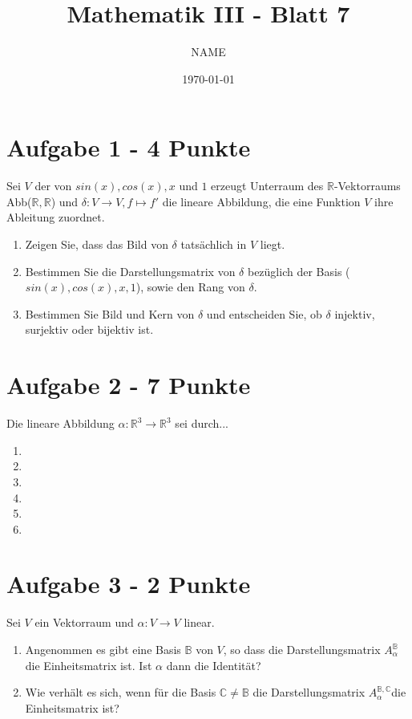\documentclass[a4paper]{article}
\author{NAME}
\title{\vspace{-2cm}Mathematik III - Blatt 7}
\date{\today{}}
\begin{document}
        
\maketitle

\section*{Aufgabe 1 - 4 Punkte}
Sei $V$ der von $sin(x),cos(x),x$ und $1$ erzeugt Unterraum des $\mathbb{R}$-Vektorraums Abb($\mathbb{R},\mathbb{R}$) und $\delta: V \rightarrow V, f \mapsto f'$ die lineare Abbildung, die eine Funktion $V$ ihre Ableitung zuordnet.

   \begin{enumerate}[label=(\alph*)]
\item Zeigen Sie, dass das Bild von $\delta$ tatsächlich in $V$ liegt.
    \item Bestimmen Sie die Darstellungsmatrix von $\delta$ bezüglich der Basis ($sin(x),cos(x),x,1$), sowie den Rang von $\delta$.
    \item Bestimmen Sie Bild und Kern von $\delta$ und entscheiden Sie, ob $\delta$ injektiv, surjektiv oder bijektiv ist.
 \end{enumerate}
 

\section*{Aufgabe 2 - 7 Punkte}
Die lineare Abbildung $\alpha: \mathbb{R}^3 \rightarrow \mathbb{R}^3$ sei durch...

  \begin{enumerate}[label=(\alph*)]
\item
    \item 
    \item
\item
    \item 
    \item
 \end{enumerate}


\section*{Aufgabe 3 - 2 Punkte}
Sei $V$ ein Vektorraum und $\alpha: V \rightarrow V$ linear.
  \begin{enumerate}[label=(\alph*)]
\item Angenommen es gibt eine Basis $\mathbb{B}$ von $V$, so dass die Darstellungsmatrix $A^{\mathbb{B}}_{\alpha}$ die Einheitsmatrix ist. Ist $\alpha$ dann die Identität?
\item Wie verhält es sich, wenn für die Basis $\mathbb{C} \neq \mathbb{B}$ die Darstellungsmatrix $A^{\mathbb{B},\mathbb{C}}_{\alpha}$die Einheitsmatrix ist?
 \end{enumerate}
\end{document}
